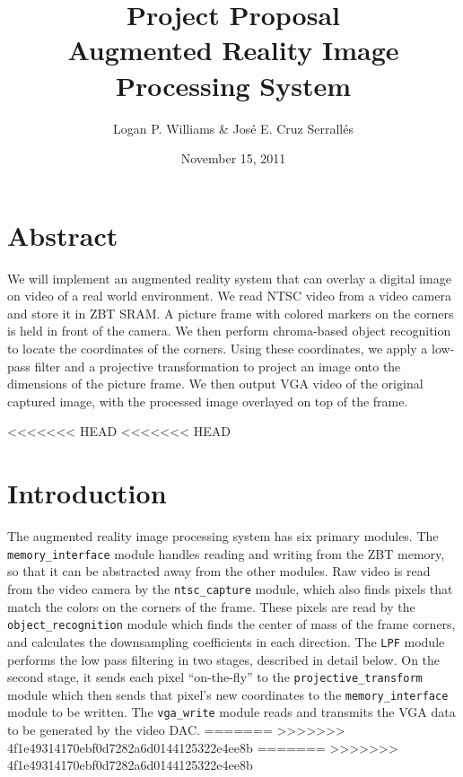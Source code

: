 \documentclass[10pt]{article}
\begin{document}
\title{Project Proposal\\Augmented Reality Image Processing System}
\author{Logan P. Williams \& Jos\'{e} E. Cruz Serrall\'{e}s}
\date{November 15, 2011}
\maketitle

\section*{Abstract}
We will implement an augmented reality system that can overlay a digital image on video of a real world environment. We read NTSC video from a video camera and store it in ZBT SRAM. A picture frame with colored markers on the corners is held in front of the camera. We then perform chroma-based object recognition to locate the coordinates of the corners. Using these coordinates, we apply a low-pass filter and a projective transformation to project an image onto the dimensions of the picture frame. We then output VGA video of the original captured image, with the processed image overlayed on top of the frame.

<<<<<<< HEAD
<<<<<<< HEAD
\tableofcontents
\newpage

\section{Introduction}

The augmented reality image processing system has six primary modules. The {\tt memory\_interface} module handles reading and writing from the ZBT memory, so that it can be abstracted away from the other modules. Raw video is read from the video camera by the {\tt ntsc\_capture} module, which also finds pixels that match the colors on the corners of the frame. These pixels are read by the {\tt object\_recognition} module which finds the center of mass of the frame corners, and calculates the downsampling coefficients in each direction. The {\tt LPF} module performs the low pass filtering in two stages, described in detail below. On the second stage, it sends each pixel ``on-the-fly'' to the {\tt projective\_transform} module which then sends that pixel's new coordinates to the {\tt memory\_interface} module to be written. The {\tt vga\_write} module reads and transmits the VGA data to be generated by the video DAC.
=======
>>>>>>> 4f1e49314170ebf0d7282a6d0144125322e4ee8b
=======
>>>>>>> 4f1e49314170ebf0d7282a6d0144125322e4ee8b
\end{document}
